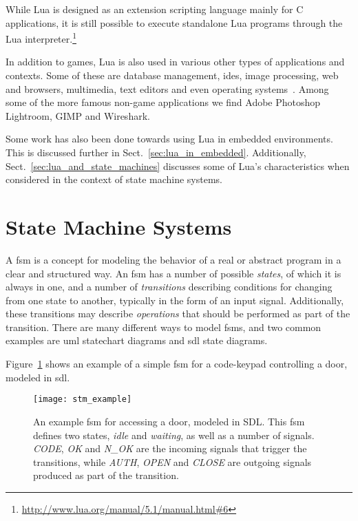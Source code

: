 \noindent
While Lua is designed as an extension scripting language mainly for C applications, it is still possible to execute standalone Lua programs through the Lua interpreter.\footnote{\url{http://www.lua.org/manual/5.1/manual.html\#6}}

\noindent
In addition to games, Lua is also used in various other types of applications and contexts. Some of these are database management, \glspl{ide}, image processing, web and browsers, multimedia, text editors and even operating systems~\cite{website:where_lua_is_used}. Among some of the more famous non-game applications we find Adobe Photoshop Lightroom, GIMP and Wireshark.

\noindent
Some work has also been done towards using Lua in embedded environments. This is discussed further in Sect.~\ref{sec:lua_in_embedded}. Additionally, Sect.~\ref{sec:lua_and_state_machines} discusses some of Lua's characteristics when considered in the context of state machine systems.

\section{State Machine Systems}
\label{sec:state_machine_system}
A \gls{fsm} is a concept for modeling the behavior of a real or abstract program in a clear and structured way. An \gls{fsm} has a number of possible \emph{states}, of which it is always in one, and a number of \emph{transitions} describing conditions for changing from one state to another, typically in the form of an input signal. Additionally, these transitions may describe \emph{operations} that should be performed as part of the transition. There are many different ways to model \glspl{fsm}, and two common examples are \gls{uml} statechart diagrams and \gls{sdl} state diagrams.

\noindent
Figure~\ref{fig:fsm_example} shows an example of a simple \gls{fsm} for a code-keypad controlling a door, modeled in \gls{sdl}.

\begin{figure}[htp]
	\centering
	\texttt{[image: stm\_example]}
	\caption[SDL finite-state machine example]{An example \gls{fsm} for accessing a door, modeled in SDL. This \gls{fsm} defines two states, \emph{idle} and \emph{waiting}, as well as a number of signals. \emph{CODE}, \emph{OK} and \emph{N\_OK} are the incoming signals that trigger the transitions, while \emph{AUTH}, \emph{OPEN} and \emph{CLOSE} are outgoing signals produced as part of the transition.}
	\label{fig:fsm_example}
\end{figure}


